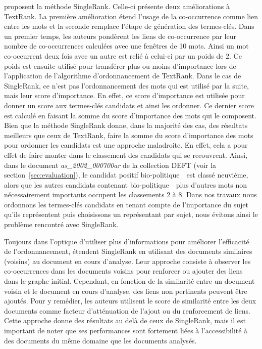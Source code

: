      proposent la méthode SingleRank. Celle-ci
    présente deux améliorations à TextRank. La première amélioration étend
    l'usage de la co-occurrence comme lien entre les mots et la seconde remplace
    l'étape de génération des termes-clés. Dans un premier temps, les auteurs
    pondèrent les liens de co-occurrence par leur nombre de co-occurrences
    calculées avec une fenêtres de 10 mots. Ainsi un mot co-occurrent deux fois
    avec un autre est relié à celui-ci par un poids de 2. Ce poids est ensuite
    utilisé pour transférer plus ou moins d'importance lors de l'application de
    l'algorithme d'ordonnancement de TextRank.
    Dans le cas de SingleRank, ce n'est pas l'ordonnancement des mots qui est
    utilisé par la suite, mais leur score d'importance. En effet, ce score
    d'importance est utilisée pour donner un score aux termes-clés candidats
    et ainsi les ordonner. Ce dernier score est calculé en faisant la somme du
    score d'importance des mots qui le composent. Bien que la méthode SingleRank
    donne, dans la majorité des cas, des résultats meilleurs que ceux de
    TextRank, faire la somme du score d'importance des mots pour ordonner les
    candidats est une approche maladroite. En effet, cela a pour effet de faire
    monter dans le classement des candidats qui se recouvrent. Ainsi, dans le
    document \textit{as\_2002\_000700ar} de la collection DEFT (voir la
    section~\ref{sec:evaluation}), le candidat positif
    \og bio-politique~\fg\ est classé neuvième, alors que les autres candidats
    contenant \og bio-politique~\fg\ plus d'autres mots non nécessairement
    importants occupent les classements 2 à 8. Dans nos travaux nous
    ordonnons les termes-clés candidats en tenant compte de l'importance du
    sujet qu'ils représentent puis choisissons un représentant par sujet, nous
    évitons ainsi le problème rencontré avec SingleRank.

    Toujours dans l'optique d'utiliser plus d'informations pour améliorer
    l'efficacité de l'ordonnancement,  étendent
    SingleRank en utilisant des documents similaires (voisins) au document en
    cours d'analyse. Leur approche consiste à observer les co-occurrences dans
    les documents voisins pour renforcer ou ajouter des liens dans le graphe
    initial. Cependant, en fonction de la similarité entre un document voisin et
    le document en cours d'analyse, des liens non pertinents peuvent être
    ajoutés. Pour y remédier, les auteurs utilisent le score de similarité entre
    les deux documents comme facteur d'atténuation de l'ajout ou du renforcement
    de liens. Cette approche donne des résultats au delà de ceux de SingleRank,
    mais il est important de noter que ses performances sont fortement liées à
    l'accessibilité à des documents du même domaine que les documents analysés.

